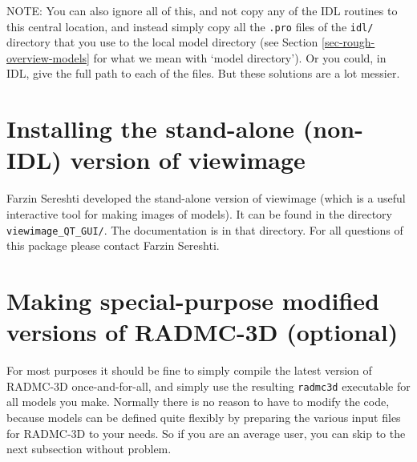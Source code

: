 \documentclass{report}
\begin{document}
% 


NOTE: You can also ignore all of this, and not copy any of the IDL routines
to this central location, and instead simply copy all the {\small\tt *.pro}
files of the {\small\tt idl/} directory that you use to the local model
directory (see Section \ref{sec-rough-overview-models} for what we mean
with `model directory'). Or you could, in IDL, give the full path to each of
the files. But these solutions are a lot messier.


\section{Installing the stand-alone (non-IDL) version of viewimage}
\label{sec-standalone-viewimage}
Farzin Sereshti developed the stand-alone version of viewimage (which is a
useful interactive tool for making images of models). It can be found in the
directory {\small\tt viewimage\_QT\_GUI/}. The documentation is in that
directory. For all questions of this package please contact Farzin Sereshti.

\section{Making special-purpose modified versions of RADMC-3D (optional)}
\label{sec-special-purpose-compile}
%
For most purposes it should be fine to simply compile the latest version of
RADMC-3D once-and-for-all, and simply use the resulting {\small\tt radmc3d}
executable for all models you make. Normally there is no reason to have to
modify the code, because models can be defined quite flexibly by preparing
the various input files for RADMC-3D to your needs. So if you are an 
average user, you can skip to the next subsection without problem.
\end{document}
